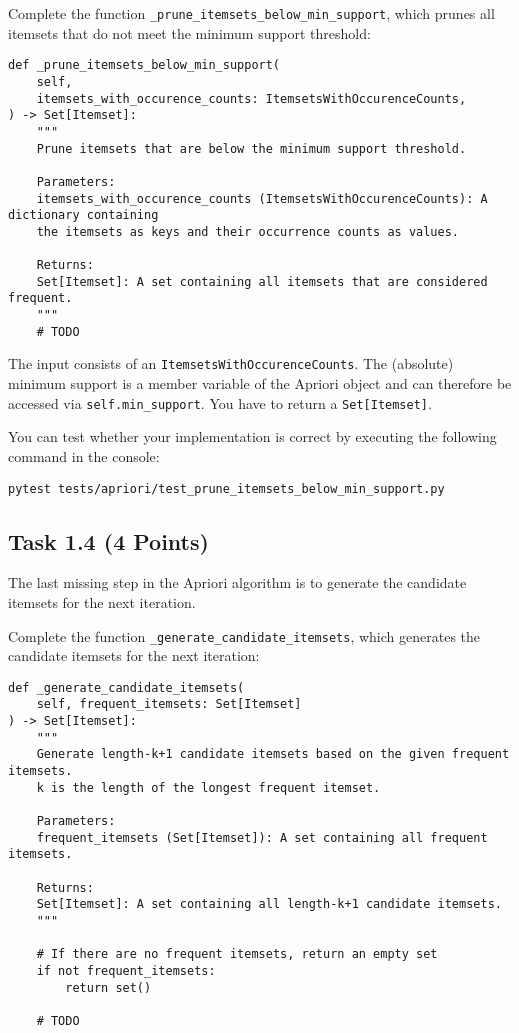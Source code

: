 \documentclass[
english,
smallborders
]{i6prcsht}
\newcommand{\points}[1]{\hfill \color{red}(#1 Points)\color{black}}
\begin{document}
Complete the function \texttt{\_prune\_itemsets\_below\_min\_support}, which prunes all itemsets that do not meet the minimum support threshold:

\vspace*{0.3cm}

\begin{lstlisting}
def _prune_itemsets_below_min_support(
	self,
	itemsets_with_occurence_counts: ItemsetsWithOccurenceCounts,
) -> Set[Itemset]:
	"""
	Prune itemsets that are below the minimum support threshold.

	Parameters:
	itemsets_with_occurence_counts (ItemsetsWithOccurenceCounts): A dictionary containing
	the itemsets as keys and their occurrence counts as values.

	Returns:
	Set[Itemset]: A set containing all itemsets that are considered frequent.
	"""
 	# TODO
\end{lstlisting}

\vspace*{0.1cm}

The input consists of an \texttt{ItemsetsWithOccurenceCounts}. The (absolute) minimum support is a member variable of the Apriori object and can therefore be accessed via \texttt{self.min\_support}. You have to return a \texttt{Set[Itemset]}.

You can test whether your implementation is correct by executing the following command in the console:

\vspace*{0.3cm}

\begin{lstlisting}
pytest tests/apriori/test_prune_itemsets_below_min_support.py
\end{lstlisting}

\vspace*{0.1cm}

\subsection*{Task 1.4 \points{4}}

The last missing step in the Apriori algorithm is to generate the candidate itemsets for the next iteration.

Complete the function \texttt{\_generate\_candidate\_itemsets}, which generates the candidate itemsets for the next iteration:

\vspace*{0.3cm}

\begin{lstlisting}
def _generate_candidate_itemsets(
    self, frequent_itemsets: Set[Itemset]
) -> Set[Itemset]:
	"""
	Generate length-k+1 candidate itemsets based on the given frequent itemsets.
	k is the length of the longest frequent itemset.

	Parameters:
	frequent_itemsets (Set[Itemset]): A set containing all frequent itemsets.

	Returns:
	Set[Itemset]: A set containing all length-k+1 candidate itemsets.
	"""

	# If there are no frequent itemsets, return an empty set
	if not frequent_itemsets:
		return set()

	# TODO
\end{lstlisting}
\end{document}
